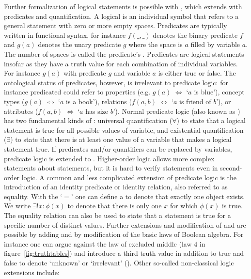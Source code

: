 Further formalization of logical statements is possible with , which extends  with predicates and
quantification. A logical  is an individual symbol that refers
to a general statement with zero or more empty spaces. Predicates are typically
written in functional syntax, for instance $f(\_,\_)$ denotes the binary
predicate $f$ and $g(a)$ denotes the unary predicate $g$ where the space is $a$
filled by variable $a$. The number of spaces is called the predicate's
. Predicates are logical statements insofar as they have a truth
value for each combination of individual variables. For instance $g(a)$ with
predicate $g$ and variable $a$ is either true or false. The ontological status
of predicates, however, is irrelevant to predicate logic: for instance
predicated could refer to properties (e.g. $g(a)$ $\Leftrightarrow$ `$a$ is
blue'), concept types ($g(a)$ $\Leftrightarrow$ `$a$ is a book'), relations
($f(a,b)$ $\Leftrightarrow$ `$a$ is friend of $b$'), or attributes ($f(a,b)$
$\Leftrightarrow$ `$a$ has size $b$'). Normal predicate logic (also known as
) has two fundamental kinds of
: universal quantification ($\forall$) to state that a
logical statement is true for all possible values of variable, and existential
quantification ($\exists$) to state that there is at least one value of a
variable that makes a logical statement true. If predicates and/or quantifiers
can be replaced by variables, predicate logic is extended to . Higher-order logic allows more complex statements about statements, but
it is hard to verify statements even in second-order logic.  A common and less
complicated extension of predicate logic is the introduction of an identity
predicate or identity relation, also referred to as equality. With the
 `$=$' one can define a  to
denote that exactly one object exists. We write $\exists!x : \phi(x)$ to
denote that there is only one $x$ for which $\phi(x)$ is true. The equality
relation can also be used to state that a statement is true for a specific
number of distinct values.  Further extensions and modification of
 and  are possible by adding
and by modification of the basic laws of Boolean algebra. For instance one can
argue against the law of excluded middle (law 4 in
figure~\ref{fig:truthtables}) and introduce a third truth value in addition to
true and false to denote `unknown' or `irrelevant' ().
Other so-called non-classical logic extensions include:

